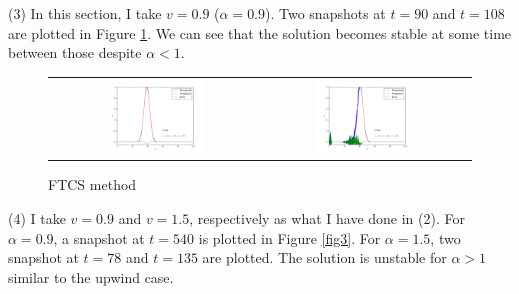 \documentclass[11pt,letterpaper]{article}
\begin{document}
(3) In this section, I take $v=0.9$ ($\alpha=0.9$). Two snapshots at $t=90$ and $t=108$ are plotted in Figure \ref{fig2}. We can see that the solution becomes stable at some time between those despite $\alpha<1$.

\begin{figure}[bth]
\centering
\begin{tabular}{cc}
    \includegraphics[width={0.49\textwidth}]{fig4.pdf} &
    \includegraphics[width={0.49\textwidth}]{fig5.pdf} \\
\end{tabular}
\caption{FTCS method}
\label{fig2}
\end{figure}

(4) I take $v=0.9$ and $v=1.5$, respectively as what I have done in (2). For $\alpha=0.9$, a snapshot at $t=540$ is plotted in Figure \ref{fig3}. For $\alpha=1.5$, two snapshot at $t=78$ and $t=135$ are plotted. The solution is unstable for $\alpha>1$ similar to the upwind case.
\end{document}
